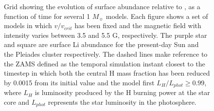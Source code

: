 \documentclass[fleqn,usenatbib]{mnras}
\begin{document}
\begin{figure}
\begin{subfigure}[h]{0.47\textwidth}
    \label{fig:subim26}
    \end{subfigure}
\caption{Grid showing the evolution of surface  abundance relative to , as a function of time for several 1 $M_{\sun}$ models. Each figure shows a set of models in which $v/v_{crit}$ has been fixed and the magnetic field with intensity varies between 3.5 and 5.5 G, respectively. The purple star and square are surface Li abundance for the present-day Sun \citep{Asplund2009} and the Pleiades cluster \citep{Sestito2005} respectively. The dashed lines make reference to the ZAMS defined as the temporal simulation instant closest to the timestep in which both the central H mass fraction has been reduced by 0.0015 from its initial value and the model first $L_H/L_{phot} \geq 0.99$, where $L_{H}$ is luminosity produced by the H burning power at the star core and $L_{phot}$ represents the star luminosity in the photosphere.}
\label{fig:image22}
\end{figure}
\end{document}
